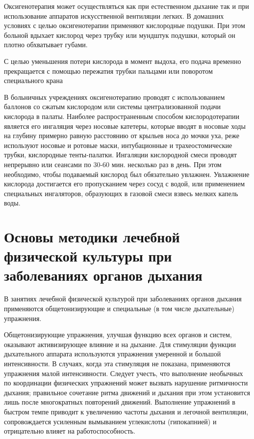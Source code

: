 \documentclass[a4paper,14pt]{extreport}
\begin{document}
Оксигенотерапия может осуществляться как при естественном дыхание так и при использование аппаратов искусственной вентиляции легких. В домашних условиях с целью оксигенотерапии применяют кислородные подушки. При этом больной вдыхает кислород через трубку или мундштук подушки, который он плотно обхватывает губами.

 С целью уменьшения потери кислорода в момент выдоха, его подача временно прекращается с помощью пережатия трубки пальцами или поворотом специального крана

В больничных учреждениях оксигенотерапию проводят с использованием баллонов со сжатым кислородом или системы централизованной подачи кислорода в палаты. Наиболее распространенным  способом кислородотерапии является его ингаляция через носовые катетеры, которые вводят в носовые ходы на глубину примерно равную расстоянию от крыльев носа до мочки уха, реже используют носовые и ротовые маски, интубационные и трахеостомические трубки, кислородные тенты-палатки.
Ингаляции кислородной смеси проводят непрерывно или сеансами по 30-60 мин. несколько раз в день. При этом необходимо, чтобы подаваемый кислород был обязательно увлажнен. Увлажнение кислорода достигается его пропусканием через сосуд с водой, или применением специальных ингаляторов, образующих в газовой смеси взвесь мелких капель воды.

\chapter{Основы методики лечебной физической культуры при заболеваниях органов дыхания}

В занятиях лечебной физической культурой при заболеваниях органов дыхания применяются общетонизирующие и специальные (в том числе дыхательные) упражнения.

Общетонизирующие упражнения, улучшая функцию всех органов и систем, оказывают активизирующее влияние и на дыхание. Для стимуляции функции дыхательного аппарата используются упражнения умеренной и большой интенсивности. В случаях, когда эта стимуляция не показана, применяются упражнения малой интенсивности. Следует учесть, что выполнение необычных по координации физических упражнений может вызвать нарушение ритмичности дыхания; правильное сочетание ритма движений и дыхания при этом установится лишь после многократных повторений движений. Выполнение упражнений в быстром темпе приводит к увеличению частоты дыхания и легочной вентиляции, сопровождается усиленным вымыванием углекислоты (гипокапнией) и отрицательно влияет на работоспособность.
\end{document}
